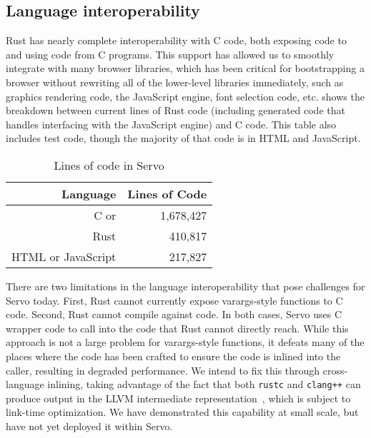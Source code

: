 \subsection{Language interoperability}
Rust has nearly complete interoperability with C code, both exposing code to and using code from
C programs.
This support has allowed us to smoothly integrate with many browser libraries, which has been
critical for bootstrapping a browser without rewriting all of the lower-level libraries immediately, such as
graphics rendering code, the JavaScript engine, font selection code, etc.
 shows the breakdown between current lines of Rust code (including generated code that
handles interfacing with the JavaScript engine) and C code.
This table also includes test code, though the majority of that code is in HTML and JavaScript.
\begin{table}
  \begin{center}
    \begin{tabular}{r || r}
      Language & Lines of Code \\
      \hline
      C or \Cplusplus{} & 1,678,427 \\
      Rust & 410,817 \\
      HTML or JavaScript & 217,827 \\
    \end{tabular}%
  \end{center}%
  \caption{Lines of code in Servo}
  \label{servo-loc}
\end{table}

There are two limitations in the language interoperability that pose challenges for Servo today.
First, Rust cannot currently expose varargs-style functions to C code.
Second, Rust cannot compile against \Cplusplus{} code.
In both cases, Servo uses C wrapper code to call into the code that Rust cannot directly
reach.
While this approach is not a large problem for varargs-style functions, it defeats many of the
places where the \Cplusplus{} code has been crafted to ensure the code is inlined into the caller,
resulting in degraded performance. We intend to fix this through cross-language inlining, taking
advantage of the fact that both \lstinline{rustc} and \lstinline{clang++} can produce output in the
LLVM intermediate representation~\cite{LLVM}, which is subject to link-time optimization. We have
demonstrated this capability at small scale, but have not yet deployed it within Servo.

